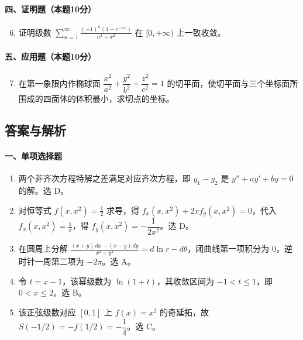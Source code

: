 \paragraph*{四、证明题（本题10分）}
\begin{enumerate}
  \setcounter{enumi}{5}
  \item 证明级数 $\displaystyle\sum_{n=1}^{\infty}\frac{(-1)^n(1-e^{-nx})}{n^2+x^2}$ 在 $[0,+\infty)$ 上一致收敛。
\end{enumerate}

\paragraph*{五、应用题（本题10分）}
\begin{enumerate}
  \setcounter{enumi}{6}
  \item 在第一象限内作椭球面 $\dfrac{x^2}{a^2}+\dfrac{y^2}{b^2}+\dfrac{z^2}{c^2}=1$ 的切平面，使切平面与三个坐标面所围成的四面体的体积最小，求切点的坐标。
\end{enumerate}

\subsection{答案与解析}

\paragraph*{一、单项选择题}
\begin{enumerate}
  \item 两个非齐次方程特解之差满足对应齐次方程，即 $y_1-y_2$ 是 $y''+ay'+by=0$ 的解。选 D。
  \item 对恒等式 $f(x,x^2)=\frac12$ 求导，得 $f_x(x,x^2)+2xf_y(x,x^2)=0$，代入 $f_x(x,x^2)=\frac1x$，得 $f_y(x,x^2)=-\dfrac1{2x^2}$。选 D。
  \item 在圆周上分解
  \(\displaystyle \frac{(x+y)\,dx-(x-y)\,dy}{x^2+y^2}
  =d\ln r-d\theta\)，闭曲线第一项积分为 $0$，逆时针一周第二项为 $-2\pi$。选 A。
  \item 令 $t=x-1$，该幂级数为 \(\displaystyle \ln(1+t)\)，其收敛区间为 $-1<t\le1$，即 $0<x\le2$。选 B。
  \item 该正弦级数对应 $[0,1]$ 上 $f(x)=x^2$ 的奇延拓，故 $S(-1/2)=-f(1/2)=-\dfrac14$。选 C。
\end{enumerate}

